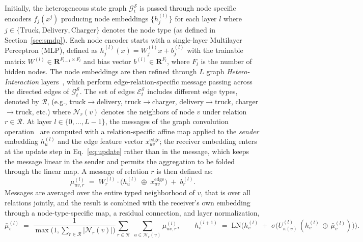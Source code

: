 \documentclass[a4paper,fleqn]{cas-sc}
\begin{document}
Initially, the heterogeneous state graph $\mathcal{G}^{\mathcal{S}}_t$ is passed through node specific encoders $f_j(x^j)$ producing node embeddings $\{h_j^{(l)}\}$ for each layer $l$ where $j\in\{\mathrm{Truck},\mathrm{Delivery},\mathrm{Charger}\}$ denotes the node type (as defined in Section~\ref{sec:smdp}).
Each node encoder starts with a single-layer Multilayer Perceptron (MLP), defined as $h_j^{(l)}(x)=W^{(l)}_{j}x+b^{(l)}_{j}$ with the trainable matrix $W^{(l)}\in\mathbf{R}^{F_{l-1} \times F_{l}}$ and bias vector $b^{(l)}\in\mathbf{R}^{F_{l}}$, where $F_{l}$ is the number of hidden nodes.
The node embeddings are then refined through $L$ graph \emph{Hetero-Interaction} layers~\cite{arowolo2025generalizationgraphneuralnetworks}, which perform edge-relation-specific message passing across the directed edges of $\mathcal{G}^\mathcal{S}_t$. 
The set of edges $\mathcal{E}^\mathcal{S}_t$ includes different edge types, denoted by $\mathcal{R}$, (e.g., truck$\rightarrow$delivery, truck$\rightarrow$charger, delivery$\rightarrow$truck, charger$\rightarrow$truck, etc.) where $\mathcal{N}_r(v)$ denotes the neighbors of node $v$ under relation $r\in\mathcal{R}$. 
At layer $l\in\{0,\dots,L-1\}$, the messages of the graph convolution operation~\cite{kipf} are computed with a relation-specific affine map applied to the \emph{sender} embedding $h^{(l)}_u$ and the edge feature vector $x^\text{edge}_{uv}$; the receiver embedding enters at the update step in Eq.~\eqref{eq:update} rather than in the message, which keeps the message linear in the sender and permits the aggregation to be folded through the linear map. A message of relation $r$ is then defined as:
\begin{equation}
\mu^{(l)}_{uv,r} \;=\; W^{(l)}_{r} \cdot \big(h_u^{(l)} \; \oplus\; x^\text{edge}_{uv}\big) \;+\;b^{(l)}_{r}.
\label{eq:message}
\end{equation}
Messages are averaged over the entire typed neighborhood of $v$, that is over all relations jointly, and the result is combined with the receiver's own embedding through a node-type-specific map, a residual connection, and layer normalization,
\begin{equation}
\bar{\mu}^{(l)}_{v}
\;=\;
\frac{1}{\max\!\big(1,\textstyle\sum_{r\in\mathcal{R}}|\mathcal{N}_r(v)|\big)}
\sum_{r\in\mathcal{R}}\;\sum_{u\in\mathcal{N}_r(v)} \mu^{(l)}_{uv,r},
\qquad
h_v^{(l+1)}
\;=\;
\mathrm{LN}\!\Big(
h_v^{(l)} \;+\; \sigma\big(U^{(l)}_{\kappa(v)}\,(h_v^{(l)} \,\oplus\, \bar{\mu}^{(l)}_{v})\big)
\Big).
\label{eq:update}
\end{equation}
\end{document}
